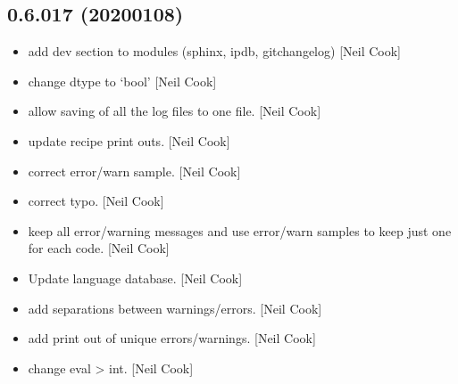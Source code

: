 \documentclass[a4paper,10pt,english]{report}
\begin{document}
\subsection{0.6.017 (2020\sphinxhyphen{}01\sphinxhyphen{}08)}
\label{\detokenize{misc/changelog:id20}}\begin{itemize}
\item {} 
 \sphinxhyphen{} add dev section to modules (sphinx, ipdb,
gitchangelog) {[}Neil Cook{]}

\item {} 
 \sphinxhyphen{} change dtype to
‘bool’ {[}Neil Cook{]}

\item {} 
 \sphinxhyphen{} allow saving of all the log
files to one file. {[}Neil Cook{]}

\item {} 
 \sphinxhyphen{} update recipe print outs.
{[}Neil Cook{]}

\item {} 
 \sphinxhyphen{} correct error/warn sample.
{[}Neil Cook{]}

\item {} 
 \sphinxhyphen{} correct typo. {[}Neil Cook{]}

\item {} 
 \sphinxhyphen{} keep all error/warning
messages and use error/warn samples to keep just one for each code.
{[}Neil Cook{]}

\item {} 
Update language database. {[}Neil Cook{]}

\item {} 
 \sphinxhyphen{} add separations between
warnings/errors. {[}Neil Cook{]}

\item {} 
 \sphinxhyphen{} add print out of unique
errors/warnings. {[}Neil Cook{]}

\item {} 
 \sphinxhyphen{} change eval \textendash{}\textgreater{} int. {[}Neil
Cook{]}


\end{itemize}
\end{document}
